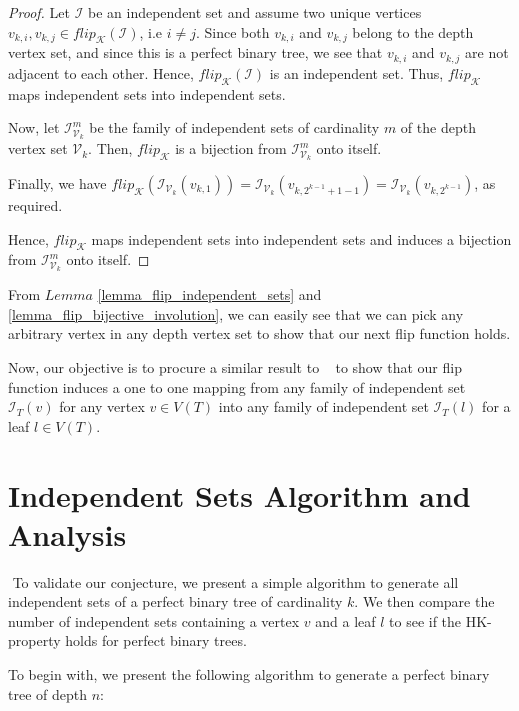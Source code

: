 \documentclass{amsart}
\theoremstyle{definition}
\begin{document}
\begin{proof}
  Let $\mathcal{I}$ be an independent set and assume two unique vertices $v_{k, i}, v_{k, j} \in flip_\mathcal{K}(\mathcal{I})$, i.e $i \neq j$. Since both $v_{k, i}$ and $v_{k, j}$ belong to the depth vertex set, and since this is a perfect binary tree, we see that $v_{k, i}$ and $v_{k, j}$ are not adjacent to each other. Hence, $flip_\mathcal{K}(\mathcal{I})$ is an independent set. Thus, $flip_\mathcal{K}$ maps independent sets into independent sets.

  Now, let $\mathcal{I}^m_{\mathcal{V}_k}$ be the family of independent sets of cardinality $m$ of the depth vertex set $\mathcal{V}_k$. Then, $flip_\mathcal{K}$ is a bijection from $\mathcal{I}^m_{\mathcal{V}_k}$ onto itself.

  Finally, we have $flip_\mathcal{K}(\mathcal{I}_{\mathcal{V}_k}(v_{k, 1})) = \mathcal{I}_{\mathcal{V}_k}(v_{k, 2^{k-1} + 1 - 1}) = \mathcal{I}_{\mathcal{V}_k}(v_{k, 2^{k-1}})$, as required.

  Hence, $flip_\mathcal{K}$ maps independent sets into independent sets and induces a bijection from $\mathcal{I}^m_{\mathcal{V}_k}$ onto itself.
\end{proof}

From $Lemma$ \ref{lemma_flip_independent_sets} and \ref{lemma_flip_bijective_involution}, we can easily see that we can pick any arbitrary vertex in any depth vertex set to show that our next flip function holds.

Now, our objective is to procure a similar result to ~\cite{MR4245360} to show that our flip function induces a one to one mapping from any family of independent set $\mathcal{I}_{T}(v)$ for any vertex $v \in V(T)$ into any family of independent set $\mathcal{I}_{T}(l)$ for a leaf $l \in V(T)$.
\newpage
\section{Independent Sets Algorithm and Analysis}\label{coclique-algorithm}
$ $
To validate our conjecture, we present a simple algorithm to generate all independent sets of a perfect binary tree of cardinality $k$. We then compare the number of independent sets containing a vertex $v$ and a leaf $l$ to see if the HK-property holds for perfect binary trees.

To begin with, we present the following algorithm to generate a perfect binary tree of depth $n$:
\end{document}

